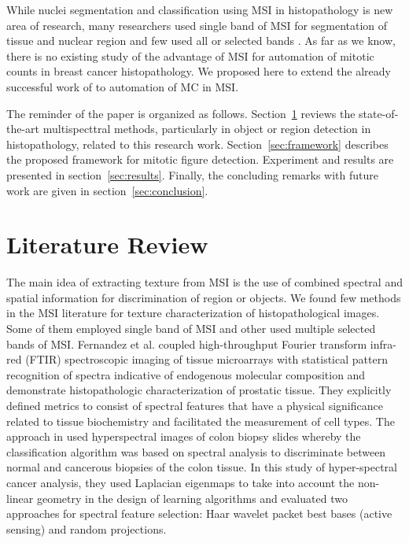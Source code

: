 \documentclass[10pt,twocolumn,letterpaper]{article}
\begin{document}
While nuclei segmentation and classification using MSI in histopathology is new area of research, many researchers used single band of MSI for segmentation of tissue and nuclear region \cite{boucheron2007, wu2009, masood2009} and few used all or selected bands \cite{fernandez2005, khelifi2012}. As far as we know, there is no existing study of the advantage of MSI for automation of mitotic counts in breast cancer histopathology. We proposed here to extend the already successful work of \cite{irshad2013b} to automation of MC in MSI.

The reminder of the paper is organized as follows. Section~\ref{sec:previous} reviews the state-of-the-art multispecttral methods, particularly in object or region detection in histopathology, related to this research work. Section~\ref{sec:framework} describes the proposed framework for mitotic figure detection. Experiment and results are presented in section~\ref{sec:results}. Finally, the concluding remarks with future work are given in section~\ref{sec:conclusion}.

\section{Literature Review}
\label{sec:previous}

The main idea of extracting texture from MSI is the use of combined spectral and spatial information for discrimination of region or objects. We found few methods in the MSI literature for texture characterization of histopathological images. Some of them employed single band of MSI and other used multiple selected bands of MSI. Fernandez et al. \cite{fernandez2005} coupled high-throughput Fourier transform infra-red (FTIR) spectroscopic imaging of tissue microarrays with statistical pattern recognition of spectra indicative of endogenous molecular composition and demonstrate histopathologic characterization of prostatic tissue. They explicitly defined metrics to consist of spectral features that have a physical significance related to tissue biochemistry and facilitated the measurement of cell types. The approach in \cite{woolfe2006} used hyperspectral images of colon biopsy slides whereby the classification algorithm was based on spectral analysis to discriminate between normal and cancerous biopsies of the colon tissue. In this study of hyper-spectral cancer analysis, they used Laplacian eigenmaps to take into account the non-linear geometry in the design of learning algorithms and evaluated two approaches for spectral feature selection: Haar wavelet packet best bases (active sensing) and random projections.
\end{document}

